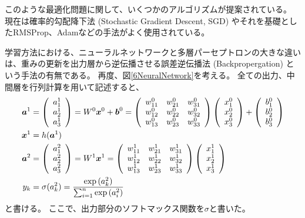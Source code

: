 このような最適化問題に関して、いくつかのアルゴリズムが提案されている。
現在は確率的勾配降下法 (Stochastic Gradient Descent, SGD\cite{SGD}) やそれを基礎としたRMSProp\cite{RMSProp}、Adam\cite{Adam}などの手法がよく使用されている。

学習方法における、ニューラルネットワークと多層パーセプトロンの大きな違いは、重みの更新を出力層から逆伝播させる誤差逆伝播法 (Backpropergation\cite{Backpropagation}) という手法の有無である。
再度、図\ref{6NeuralNetwork}を考える。
全ての出力、中間層を行列計算を用いて記述すると、
\begin{equation}
 \begin{split}
  {\mbox{\boldmath{$a$}}}^1&=
  \left(
    \begin{array}{ccc}
      a^1_1 \\
      a^1_2 \\
      a^1_3 
    \end{array}
  \right)
  =
  W^0{\mbox{\boldmath{$x$}}}^0 + {\mbox{\boldmath{$b$}}}^0
  =
  \left(
    \begin{array}{ccc}
      w^0_{11} & w^0_{21} & w^0_{31} \\
      w^0_{12} & w^0_{22} & w^0_{32} \\
      w^0_{13} & w^0_{23} & w^0_{33}
    \end{array}
  \right)
  \left(
    \begin{array}{ccc}
      x^0_1 \\
      x^0_2 \\
      x^0_3
    \end{array}
  \right)
  +
  \left(
    \begin{array}{ccc}
      b^0_1 \\
      b^0_2 \\
      b^0_3
    \end{array}
  \right)\\
  {\mbox{\boldmath{$x$}}}^1&=h({\mbox{\boldmath{$a$}}}^1)\\
  {\mbox{\boldmath{$a$}}}^2&=
  \left(
    \begin{array}{ccc}
      a^2_1 \\
      a^2_2 \\
      a^2_3 
    \end{array}
  \right)
  =
  W^1{\mbox{\boldmath{$x$}}}^1
  =
  \left(
    \begin{array}{ccc}
      w^1_{11} & w^1_{21} & w^1_{31} \\
      w^1_{12} & w^1_{22} & w^1_{32} \\
      w^1_{13} & w^1_{23} & w^1_{33}
    \end{array}
  \right)
  \left(
    \begin{array}{ccc}
      x^1_1 \\
      x^1_2 \\
      x^1_3
    \end{array}
  \right)\\
 y_k &= \sigma(a^2_k) = \frac{\exp{(a^2_k)}}{\sum^n_{i=1}\exp{(a^2_i)}}
 \end{split}
\end{equation}
と書ける。
ここで、出力部分のソフトマックス関数を$\sigma$と書いた。

